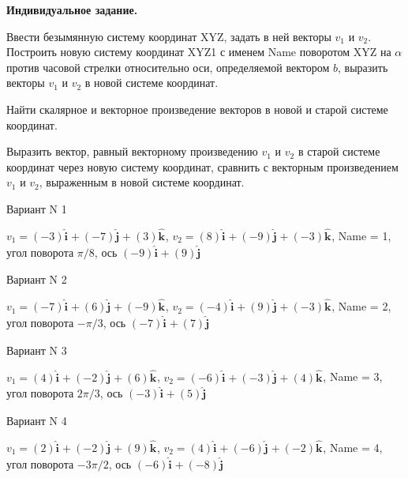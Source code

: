 \documentclass[11pt]{report}
\begin{document}
\pagestyle{empty}

{\bf Индивидуальное задание.}


Ввести безымянную систему координат XYZ, задать в ней векторы $v_1$ и $v_2$.
Построить новую систему координат XYZ1 с именем Name поворотом  XYZ на $\alpha$ против часовой стрелки относительно оси,
определяемой вектором $b$, выразить векторы $v_1$ и $v_2$ в новой системе координат. 


Найти скалярное и векторное произведение векторов в новой и старой системе координат. 


Выразить вектор, равный векторному произведению $v_1$ и $v_2$ в старой системе координат через новую систему координат,
сравнить с векторным произведением $v_1$ и $v_2$, выраженным в новой системе координат.

Вариант N 1

$v_1 = \left(-3\right)\mathbf{\hat{i}_{}} + \left(-7\right)\mathbf{\hat{j}_{}} + \left(3\right)\mathbf{\hat{k}_{}}$, $v_2 = \left(8\right)\mathbf{\hat{i}_{}} + \left(-9\right)\mathbf{\hat{j}_{}} + \left(-3\right)\mathbf{\hat{k}_{}}$, Name = 1, угол поворота $\pi / 8$, ось $\left(-9\right)\mathbf{\hat{i}_{}} + \left(9\right)\mathbf{\hat{j}_{}}$

Вариант N 2

$v_1 = \left(-7\right)\mathbf{\hat{i}_{}} + \left(6\right)\mathbf{\hat{j}_{}} + \left(-9\right)\mathbf{\hat{k}_{}}$, $v_2 = \left(-4\right)\mathbf{\hat{i}_{}} + \left(9\right)\mathbf{\hat{j}_{}} + \left(-3\right)\mathbf{\hat{k}_{}}$, Name = 2, угол поворота $- \pi / 3$, ось $\left(-7\right)\mathbf{\hat{i}_{}} + \left(7\right)\mathbf{\hat{j}_{}}$

Вариант N 3

$v_1 = \left(4\right)\mathbf{\hat{i}_{}} + \left(-2\right)\mathbf{\hat{j}_{}} + \left(6\right)\mathbf{\hat{k}_{}}$, $v_2 = \left(-6\right)\mathbf{\hat{i}_{}} + \left(-3\right)\mathbf{\hat{j}_{}} + \left(4\right)\mathbf{\hat{k}_{}}$, Name = 3, угол поворота $2 \pi / 3$, ось $\left(-3\right)\mathbf{\hat{i}_{}} + \left(5\right)\mathbf{\hat{j}_{}}$

Вариант N 4

$v_1 = \left(2\right)\mathbf{\hat{i}_{}} + \left(-2\right)\mathbf{\hat{j}_{}} + \left(9\right)\mathbf{\hat{k}_{}}$, $v_2 = \left(4\right)\mathbf{\hat{i}_{}} + \left(-6\right)\mathbf{\hat{j}_{}} + \left(-2\right)\mathbf{\hat{k}_{}}$, Name = 4, угол поворота $- 3 \pi / 2$, ось $\left(-6\right)\mathbf{\hat{i}_{}} + \left(-8\right)\mathbf{\hat{j}_{}}$
\end{document}
